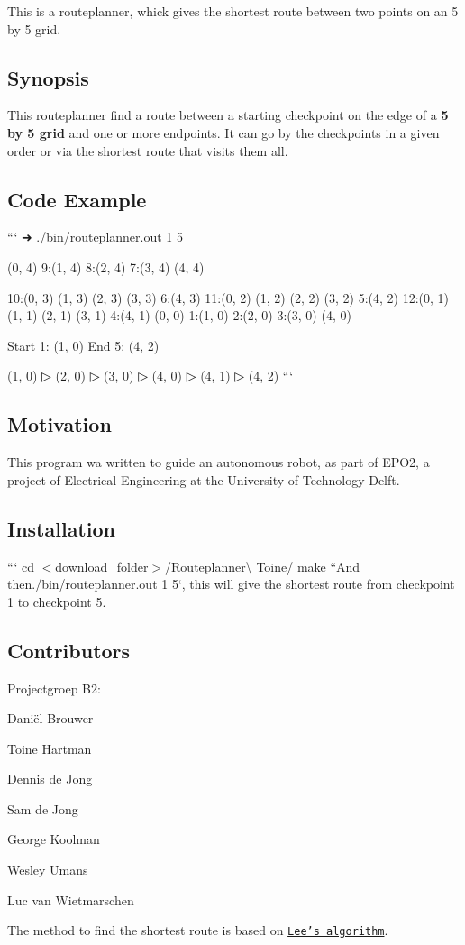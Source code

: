 This is a routeplanner, whick gives the shortest route between two points on an 5 by 5 grid. \subsection*{Synopsis}

This routeplanner find a route between a starting checkpoint on the edge of a {\bfseries 5 by 5 grid} and one or more endpoints. It can go by the checkpoints in a given order or via the shortest route that visits them all. 

\subsection*{Code Example}

``` ➜ ./bin/routeplanner.out 1 5 \begin{DoxyVerb}(0, 4)   9:(1, 4)   8:(2, 4)   7:(3, 4)     (4, 4)
\end{DoxyVerb}
 10\+:(0, 3) (1, 3) (2, 3) (3, 3) 6\+:(4, 3) 11\+:(0, 2) (1, 2) (2, 2) (3, 2) 5\+:(4, 2) 12\+:(0, 1) (1, 1) (2, 1) (3, 1) 4\+:(4, 1) (0, 0) 1\+:(1, 0) 2\+:(2, 0) 3\+:(3, 0) (4, 0)

Start 1\+: (1, 0) End 5\+: (4, 2)

(1, 0) ▷ (2, 0) ▷ (3, 0) ▷ (4, 0) ▷ (4, 1) ▷ (4, 2) ```

\subsection*{Motivation}

This program wa written to guide an autonomous robot, as part of E\+P\+O2, a project of Electrical Engineering at the University of Technology Delft.

\subsection*{Installation}

``` cd $<$download\+\_\+folder$>$/\+Routeplanner\textbackslash{} Toine/ make ``{\ttfamily  And then}./bin/routeplanner.out 1 5`, this will give the shortest route from checkpoint 1 to checkpoint 5.

\subsection*{Contributors}

Projectgroep B2\+:


\begin{DoxyItemize}
\item Daniël Brouwer
\item Toine Hartman
\item Dennis de Jong
\item Sam de Jong
\item George Koolman
\item Wesley Umans
\item Luc van Wietmarschen
\end{DoxyItemize}

The method to find the shortest route is based on \href{http://en.wikipedia.org/wiki/Lee_algorithm}{\tt Lee's algorithm}. 